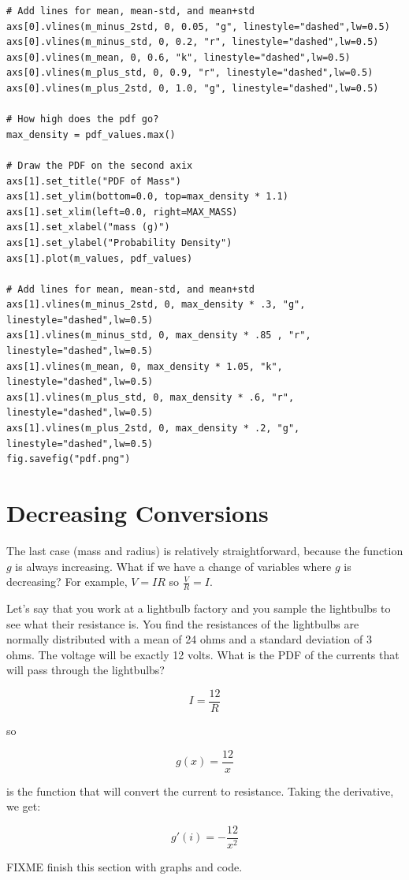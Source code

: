 \begin{verbatim}
# Add lines for mean, mean-std, and mean+std
axs[0].vlines(m_minus_2std, 0, 0.05, "g", linestyle="dashed",lw=0.5)
axs[0].vlines(m_minus_std, 0, 0.2, "r", linestyle="dashed",lw=0.5)
axs[0].vlines(m_mean, 0, 0.6, "k", linestyle="dashed",lw=0.5)
axs[0].vlines(m_plus_std, 0, 0.9, "r", linestyle="dashed",lw=0.5)
axs[0].vlines(m_plus_2std, 0, 1.0, "g", linestyle="dashed",lw=0.5)

# How high does the pdf go?
max_density = pdf_values.max()

# Draw the PDF on the second axix
axs[1].set_title("PDF of Mass")
axs[1].set_ylim(bottom=0.0, top=max_density * 1.1)
axs[1].set_xlim(left=0.0, right=MAX_MASS)
axs[1].set_xlabel("mass (g)")
axs[1].set_ylabel("Probability Density")
axs[1].plot(m_values, pdf_values)

# Add lines for mean, mean-std, and mean+std
axs[1].vlines(m_minus_2std, 0, max_density * .3, "g", linestyle="dashed",lw=0.5)
axs[1].vlines(m_minus_std, 0, max_density * .85 , "r", linestyle="dashed",lw=0.5)
axs[1].vlines(m_mean, 0, max_density * 1.05, "k", linestyle="dashed",lw=0.5)
axs[1].vlines(m_plus_std, 0, max_density * .6, "r", linestyle="dashed",lw=0.5)
axs[1].vlines(m_plus_2std, 0, max_density * .2, "g", linestyle="dashed",lw=0.5)
fig.savefig("pdf.png")
\end{verbatim}

\section{Decreasing Conversions}

The last case (mass and radius) is relatively straightforward, because the function $g$ is always increasing. What if we have a change of variables where 
$g$ is decreasing? For example, $V= IR$ so $\frac{V}{R} = I$.

Let's say that you work at a lightbulb factory and you sample the lightbulbs to see what their resistance is. You find the resistances of the lightbulbs are normally distributed with a mean of 24 ohms and a standard deviation of 3 ohms. The voltage will be exactly 12 volts. What is the PDF of the currents that will pass through the lightbulbs?

$$I = \frac{12}{R}$$

so 

$$g(x) = \frac{12}{x}$$

is the function that will convert the current to resistance. Taking the derivative, we get:

$$g'(i) = -\frac{12}{x^2}$$


FIXME finish this section with graphs and code. 








